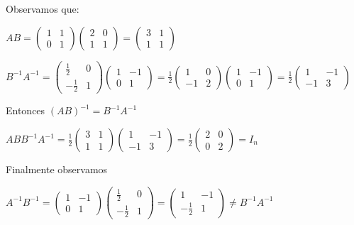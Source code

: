 \documentclass[12pt]{article}
\begin{document}
\begin{description}
\begin{enumerate}
Observamos que:

\begin{math}
A B =
\begin{pmatrix}
1 & 1 \\
0 & 1
\end{pmatrix}
\begin{pmatrix}
2 & 0 \\
1 & 1
\end{pmatrix}=
\begin{pmatrix}
3 & 1 \\
1 & 1
\end{pmatrix}
\end{math}

\begin{math}
B^{-1} A^{-1} =
\begin{pmatrix}
\frac{1}{2} & 0 \\
-\frac{1}{2} & 1
\end{pmatrix}
\begin{pmatrix}
1 & -1 \\
0 & 1
\end{pmatrix}= \frac{1}{2}
\begin{pmatrix}
1 & 0 \\
-1 & 2
\end{pmatrix}
\begin{pmatrix}
1 & -1 \\
0 & 1
\end{pmatrix}= \frac{1}{2}
\begin{pmatrix}
1 & -1 \\
-1 & 3
\end{pmatrix}
\end{math}

Entonces $(A B)^{-1} = B^{-1} A^{-1}$

\begin{math}
A B B^{-1} A^{-1} = \frac{1}{2}
\begin{pmatrix}
3 & 1 \\
1 & 1
\end{pmatrix}
\begin{pmatrix}
1 & -1 \\
-1 & 3
\end{pmatrix} = \frac{1}{2}
\begin{pmatrix}
2 & 0 \\
0 & 2
\end{pmatrix} = I_n
\end{math}

Finalmente observamos

\begin{math}
A^{-1} B^{-1} =
\begin{pmatrix}
1 & -1 \\
0 & 1
\end{pmatrix}
\begin{pmatrix}
\frac{1}{2} & 0 \\
-\frac{1}{2} & 1
\end{pmatrix} =
\begin{pmatrix}
1 & -1 \\
-\frac{1}{2} & 1
\end{pmatrix} \ne B^{-1} A^{-1}
\end{math}


\end{enumerate}
\end{description}
\end{document}

